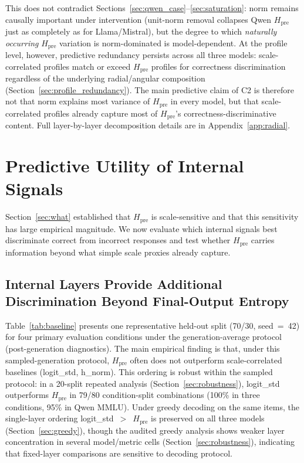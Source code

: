 \documentclass{ieeeaccess}
\newcommand{\Hpre}{H_{\text{pre}}}
\begin{document}
This does not contradict Sections~\ref{sec:qwen_case}--\ref{sec:saturation}: norm remains causally important under intervention (unit-norm removal collapses Qwen $\Hpre$ just as completely as for Llama/Mistral), but the degree to which \textit{naturally occurring} $\Hpre$ variation is norm-dominated is model-dependent. At the profile level, however, predictive redundancy persists across all three models: scale-correlated profiles match or exceed $\Hpre$ profiles for correctness discrimination regardless of the underlying radial/angular composition (Section~\ref{sec:profile_redundancy}). The main predictive claim of C2 is therefore not that norm explains most variance of $\Hpre$ in every model, but that scale-correlated profiles already capture most of $\Hpre$'s correctness-discriminative content. Full layer-by-layer decomposition details are in Appendix~\ref{app:radial}.


\section{Predictive Utility of Internal Signals}
\label{sec:predictive}

Section~\ref{sec:what} established that $\Hpre$ is scale-sensitive and that this sensitivity has large empirical magnitude. We now evaluate which internal signals best discriminate correct from incorrect responses and test whether $\Hpre$ carries information beyond what simple scale proxies already capture.

\subsection{Internal Layers Provide Additional Discrimination Beyond Final-Output Entropy}

Table~\ref{tab:baseline} presents one representative held-out split (70/30, seed~=~42) for four primary evaluation conditions under the generation-average protocol (post-generation diagnostics). The main empirical finding is that, under this sampled-generation protocol, $\Hpre$ often does not outperform scale-correlated baselines (logit\_std, h\_norm). This ordering is robust within the sampled protocol: in a 20-split repeated analysis (Section~\ref{sec:robustness}), logit\_std outperforms $\Hpre$ in 79/80 condition-split combinations (100\% in three conditions, 95\% in Qwen MMLU). Under greedy decoding on the same items, the single-layer ordering logit\_std~$>$~$\Hpre$ is preserved on all three models (Section~\ref{sec:greedy}), though the audited greedy analysis shows weaker layer concentration in several model/metric cells (Section~\ref{sec:robustness}), indicating that fixed-layer comparisons are sensitive to decoding protocol.
\end{document}
